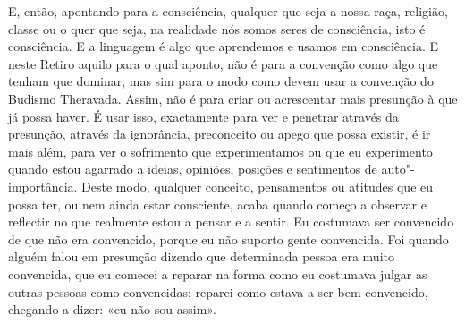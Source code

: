 E, então, apontando para a consciência, qualquer que seja a nossa raça,
religião, classe ou o quer que seja, na realidade nós somos seres de
consciência, isto é consciência. E a linguagem é algo que aprendemos e
usamos em consciência. E neste Retiro aquilo para o qual aponto, não é
para a convenção como algo que tenham que dominar, mas sim para o modo
como devem usar a convenção do Budismo Theravada. Assim, não é para
criar ou acrescentar mais presunção à que já possa haver. É usar isso,
exactamente para ver e penetrar através da presunção, através da
ignorância, preconceito ou apego que possa existir, é ir mais além, para
ver o sofrimento que experimentamos ou que eu experimento quando estou
agarrado a ideias, opiniões, posições e sentimentos de auto"-importância.
Deste modo, qualquer conceito, pensamentos ou atitudes que eu possa ter,
ou nem ainda estar consciente, acaba quando começo a observar e
reflectir no que realmente estou a pensar e a sentir. Eu costumava ser
convencido de que não era convencido, porque eu não suporto gente
convencida. Foi quando alguém falou em presunção dizendo que determinada
pessoa era muito convencida, que eu comecei a reparar na forma como eu
costumava julgar as outras pessoas como convencidas; reparei como estava
a ser bem convencido, chegando a dizer: «eu não sou assim».

